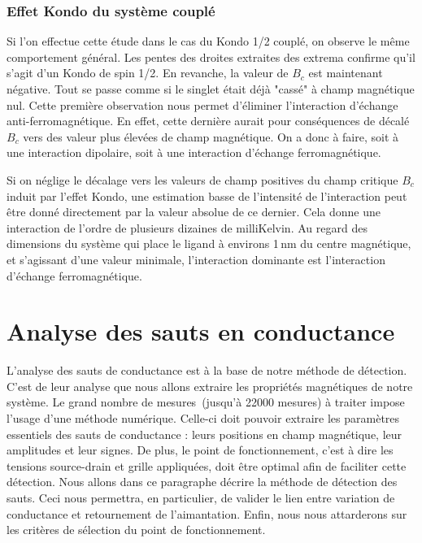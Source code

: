 \subsubsection{Effet Kondo du système couplé}
Si l'on effectue cette étude dans le cas du Kondo 1/2 couplé, on observe le même comportement général. Les pentes des droites extraites des extrema confirme qu'il s'agit d'un Kondo de spin 1/2. En revanche, la valeur de $B_c$ est maintenant négative. Tout se passe comme si le singlet était déjà "cassé" à champ magnétique nul. Cette première observation nous permet d'éliminer l'interaction d'échange anti-ferromagnétique. En effet, cette dernière aurait pour conséquences de décalé $B_c$ vers des valeur plus élevées de champ magnétique. On a donc à faire, soit à une interaction dipolaire, soit à une interaction d'échange ferromagnétique.

Si on néglige le décalage vers les valeurs de champ positives du champ critique $B_c$ induit par l'effet Kondo, une estimation basse de l'intensité de l'interaction peut être donné directement par la valeur absolue de ce dernier. Cela donne une interaction de l'ordre de plusieurs dizaines de milliKelvin. Au regard des dimensions du système qui place le ligand à environs 1\,nm du centre magnétique, et s'agissant d'une valeur minimale, l'interaction dominante est l'interaction d'échange ferromagnétique.

\section{Analyse des sauts en conductance}
L'analyse des sauts de conductance est à la base de notre méthode de détection. C'est de leur analyse que nous allons extraire les propriétés magnétiques de notre système. Le grand nombre de mesures~(jusqu'à 22000 mesures) à traiter impose l'usage d'une méthode numérique. Celle-ci doit pouvoir extraire les paramètres essentiels des sauts de conductance : leurs positions en champ magnétique, leur amplitudes et leur signes. De plus, le point de fonctionnement, c'est à dire les tensions source-drain et grille appliquées, doit être optimal afin de faciliter cette détection. Nous allons dans ce paragraphe décrire la méthode de détection des sauts. Ceci nous permettra, en particulier, de valider le lien entre variation de conductance et retournement de l'aimantation. Enfin, nous nous attarderons sur les critères de sélection du point de fonctionnement.

